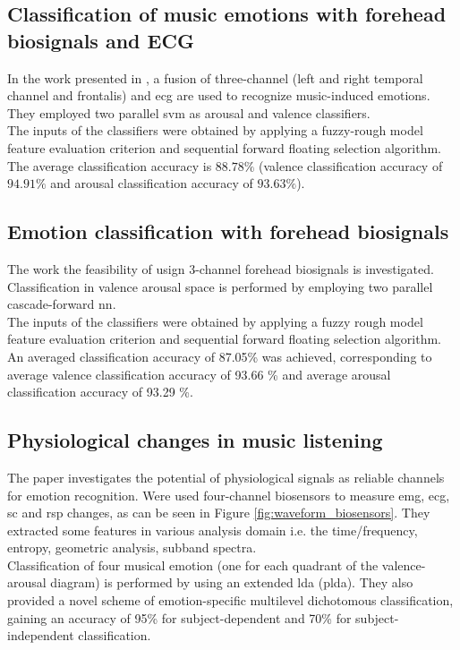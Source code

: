 \subsection{Classification of music emotions with  forehead biosignals and ECG}
In the work presented in \cite{naji2014classification}, a fusion of three-channel (left and right  temporal channel and frontalis) and \gls{ecg} are used to recognize music-induced emotions. They employed two parallel \gls{svm} as arousal and valence classifiers.
\\ \indent
The inputs of the classifiers were obtained by applying a fuzzy-rough model feature evaluation criterion and sequential forward floating selection algorithm.
\\
The average classification accuracy is $88.78\%$ (valence classification accuracy of $94.91\%$ and arousal classification accuracy of $93.63\%$).

\subsection{Emotion classification with forehead biosignals}
The work \cite{naji2015emotion} the feasibility of usign 3-channel forehead biosignals is investigated. Classification in valence arousal space is performed by employing two parallel cascade-forward \gls{nn}.
\\
The inputs of the classifiers were obtained by applying a fuzzy rough model feature evaluation criterion and sequential forward floating selection algorithm. An averaged classification accuracy of 87.05\% was achieved, corresponding to average valence classification accuracy of 93.66 \% and average arousal classification accuracy of 93.29 \%.

\subsection{Physiological changes in music listening}
The paper \cite{kim2008emotion} investigates the potential of physiological signals as reliable channels for emotion recognition. Were used four-channel biosensors to measure \gls{emg}, \gls{ecg}, \gls{sc} and \gls{rsp} changes, as can be seen in Figure \ref{fig:waveform_biosensors}. They extracted some features in various analysis domain i.e. the time/frequency, entropy, geometric analysis, subband spectra.
\\ \indent
Classification of four musical emotion (one for each quadrant of the valence-arousal diagram) is performed by using an extended \gls{lda} (p\gls{lda}). They also provided a novel scheme of emotion-specific multilevel dichotomous classification, gaining an accuracy of 95\% for subject-dependent and 70\% for subject-independent classification.
 
